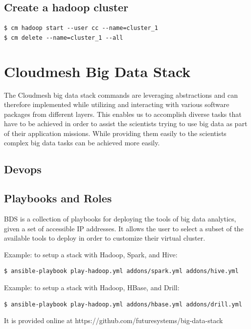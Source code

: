 \subsection{Create a hadoop cluster}

\begin{Verbatim}[fontfamily=helvetica]
$ cm hadoop start --user cc --name=cluster_1
$ cm delete --name=cluster_1 --all  
\end{Verbatim}


\section{Cloudmesh Big Data Stack}\label{S:cm-bds}

The Cloudmesh big data stack commands are leveraging abstractions and
can therefore implemented while utilizing and interacting with various
software packages from different layers. This enables us to accomplish
diverse tasks that have to be achieved in order to assist the
scientists trying to use big data as part of their application
missions. While providing them easily to the scientists complex big
data tasks can be achieved more easily.

\subsection{Devops}


\subsection{Playbooks and Roles}

BDS is a collection of playbooks for deploying the tools of big data
analytics, given a set of accessible IP addresses. It allows the user
to select a subset of the available tools to deploy in order to
customize their virtual cluster.

Example: to setup a stack with Hadoop, Spark, and Hive:
\begin{Verbatim}
$ ansible-playbook play-hadoop.yml addons/spark.yml addons/hive.yml
\end{Verbatim}

Example: to setup a stack with Hadoop, HBase, and Drill:

\begin{Verbatim}
$ ansible-playbook play-hadoop.yml addons/hbase.yml addons/drill.yml
\end{Verbatim}

It is provided online at https://github.com/futuresystems/big-data-stack

